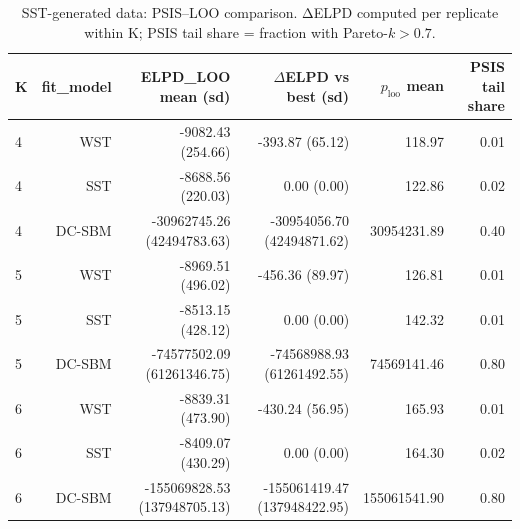 \begin{table}[!h]
\centering
\caption{SST-generated data: PSIS–LOO comparison. ΔELPD computed per replicate within K; PSIS tail share = fraction with Pareto-\(k>0.7\).\\\label{tab:sst-main-psis-loo}}
\centering
\begin{tabular}[t]{lrrrrr}
\toprule
K & fit_model & ELPD\_LOO mean (sd) & $\Delta$ELPD vs best (sd) & $p_{\text{loo}}$ mean & PSIS tail share\\
\midrule
4 & WST & -9082.43 (254.66) & -393.87 (65.12) & 118.97 & 0.01\\
4 & SST & -8688.56 (220.03) & 0.00 (0.00) & 122.86 & 0.02\\
4 & DC-SBM & -30962745.26 (42494783.63) & -30954056.70 (42494871.62) & 30954231.89 & 0.40\\
5 & WST & -8969.51 (496.02) & -456.36 (89.97) & 126.81 & 0.01\\
5 & SST & -8513.15 (428.12) & 0.00 (0.00) & 142.32 & 0.01\\
5 & DC-SBM & -74577502.09 (61261346.75) & -74568988.93 (61261492.55) & 74569141.46 & 0.80\\
6 & WST & -8839.31 (473.90) & -430.24 (56.95) & 165.93 & 0.01\\
6 & SST & -8409.07 (430.29) & 0.00 (0.00) & 164.30 & 0.02\\
6 & DC-SBM & -155069828.53 (137948705.13) & -155061419.47 (137948422.95) & 155061541.90 & 0.80\\
\bottomrule
\end{tabular}
\end{table}
